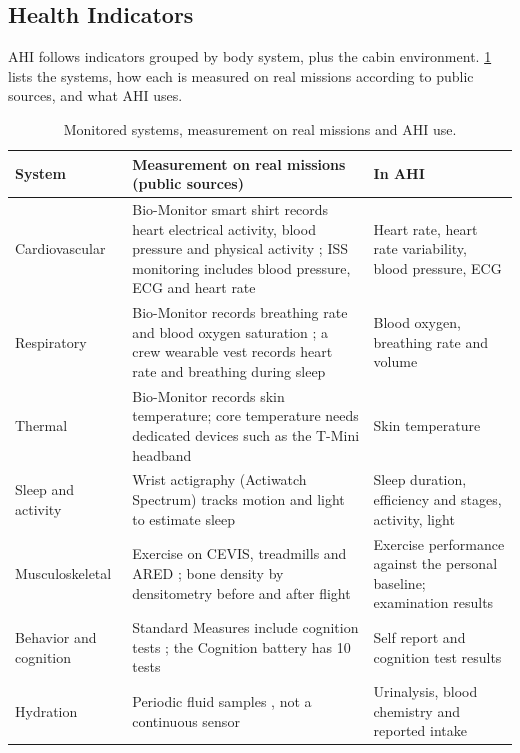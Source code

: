 \subsection{Health Indicators}
\label{subsec:health-indicators}

AHI follows indicators grouped by body system, plus the cabin environment. \ref{tab:indicators} lists the systems, how each is measured on real missions according to public sources, and what AHI uses.

\begin{table}[htbp]
\centering
\vspace{0.8em}
\caption{Monitored systems, measurement on real missions and AHI use.}
\label{tab:indicators}
\small
\begin{tabular}{p{2.6cm}p{6.4cm}p{5.2cm}}
\hline
\textbf{System} & \textbf{Measurement on real missions (public sources)} & \textbf{In AHI} \\
\hline
Cardiovascular & Bio-Monitor smart shirt records heart electrical activity, blood pressure and physical activity \cite{canadian_space_agency_biomonitor}; ISS monitoring includes blood pressure, ECG and heart rate \cite{nasa_jsc_exercise_countermeasures} & Heart rate, heart rate variability, blood pressure, ECG \\
Respiratory & Bio-Monitor records breathing rate and blood oxygen saturation \cite{canadian_space_agency_biomonitor}; a crew wearable vest records heart rate and breathing during sleep \cite{nasa_wearable_tech_iss} & Blood oxygen, breathing rate and volume \\
Thermal & Bio-Monitor records skin temperature; core temperature needs dedicated devices such as the T-Mini headband \cite{nasa_wearable_tech_iss} & Skin temperature \\
Sleep and activity & Wrist actigraphy (Actiwatch Spectrum) tracks motion and light to estimate sleep \cite{nasa_wearable_tech_iss} & Sleep duration, efficiency and stages, activity, light \\
Musculoskeletal & Exercise on CEVIS, treadmills and ARED \cite{nasa_jsc_exercise_countermeasures}; bone density by densitometry before and after flight \cite{lang2004bone} & Exercise performance against the personal baseline; examination results \\
Behavior and cognition & Standard Measures include cognition tests \cite{nasa_standard_measures}; the Cognition battery has 10 tests \cite{basner2015cognition} & Self report and cognition test results \\
Hydration & Periodic fluid samples \cite{nasa_standard_measures}, not a continuous sensor & Urinalysis, blood chemistry and reported intake \\

\end{tabular}
\end{table}
